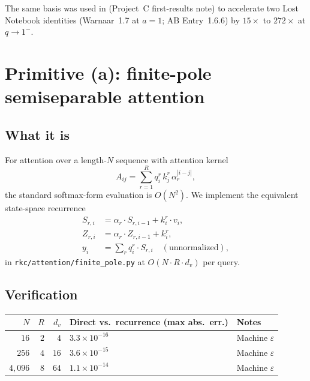\documentclass[11pt,reqno]{amsart}
\theoremstyle{definition}
\begin{document}
The same basis was used in \cite{ProjectC} (Project~C first-results
note) to accelerate two Lost Notebook identities (Warnaar~1.7 at
$a = 1$; AB Entry~1.6.6) by $15\times$ to $272\times$ at $q \to 1^-$.

\section{Primitive (a): finite-pole semiseparable attention}\label{sec:attention}

\subsection{What it is}
For attention over a length-$N$ sequence with attention kernel
\begin{equation}\label{eq:attn-kernel}
A_{ij} = \sum_{r=1}^R q_i^r \, k_j^r \, \alpha_r^{|i - j|},
\end{equation}
the standard softmax-form evaluation is $O(N^2)$. We implement the
equivalent state-space recurrence
\begin{align*}
S_{r,i} &= \alpha_r \cdot S_{r, i-1} + k_i^r \cdot v_i, \\
Z_{r,i} &= \alpha_r \cdot Z_{r, i-1} + k_i^r, \\
y_i &= \sum_r q_i^r \cdot S_{r, i} \quad (\text{unnormalized}),
\end{align*}
in \verb|rkc/attention/finite_pole.py| at $O(N \cdot R \cdot d_v)$ per
query.

\subsection{Verification}
\begin{center}
\begin{tabular}{rrrll}
\toprule
$N$ & $R$ & $d_v$ & Direct vs.\ recurrence (max abs.\ err.) & Notes \\
\midrule
$16$ & $2$ & $4$ & $3.3 \times 10^{-16}$ & Machine $\varepsilon$ \\
$256$ & $4$ & $16$ & $3.6 \times 10^{-15}$ & Machine $\varepsilon$ \\
$4{,}096$ & $8$ & $64$ & $1.1 \times 10^{-14}$ & Machine $\varepsilon$ \\
\bottomrule
\end{tabular}
\end{center}
\end{document}
